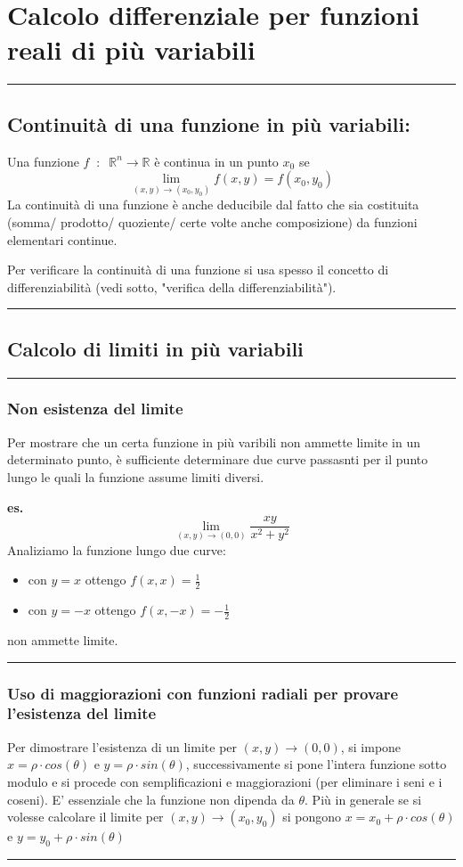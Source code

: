 \section*{Calcolo differenziale per funzioni reali di più variabili}
\rule{\textwidth}{2pt}
\subsection*{Continuità di una funzione in più variabili:}
Una funzione $f \;\;:\;\; \mathbb{R}^n \rightarrow  \mathbb{R}$ è continua in un punto $x_0$ se 
\[
    \lim_{(x,y)\rightarrow (x_0,y_0)} f(x,y) = f(x_0,y_0)
\]
La continuità di una funzione è anche deducibile dal fatto che sia costituita (somma/ prodotto/ quoziente/ certe volte anche composizione) da funzioni elementari continue.
\begin{tcolorbox}
    Per verificare la continuità di una funzione si usa spesso il concetto di differenziabilità (vedi sotto, "verifica della differenziabilità").
\end{tcolorbox}
\rule{\textwidth}{2pt}
\subsection*{Calcolo di limiti in più variabili}
\rule{\textwidth}{0.4pt}
\subsubsection*{Non esistenza del limite}
\begin{tcolorbox}
Per mostrare che un certa funzione in più varibili non ammette limite in un determinato punto, è sufficiente determinare due curve passasnti per il punto lungo le quali la funzione assume limiti diversi.
\end{tcolorbox}
\textbf{es.} 
\[
    \lim_{(x,y)\rightarrow (0,0)} \frac{xy}{x^2+y^2}
\]
Analiziamo la funzione lungo due curve:
\begin{itemize}
    \item con $y=x$ ottengo $f(x,x) = \frac{1}{2}$
    \item con $y=-x$ ottengo $f(x,-x) = - \frac{1}{2}$
\end{itemize}
non ammette limite.\newline
\rule{\textwidth}{0.4pt}
\subsubsection*{Uso di maggiorazioni con funzioni radiali per provare l'esistenza del limite}
\begin{tcolorbox}
Per dimostrare l'esistenza di un limite per $(x,y) \rightarrow (0,0)$, si impone $x=\rho \cdot  cos(\theta)$ e $y= \rho \cdot sin(\theta)$, successivamente si pone l'intera funzione sotto modulo e si procede con semplificazioni e maggiorazioni (per eliminare i seni e i coseni). E' essenziale che la funzione non dipenda da $\theta$.\newline
Più in generale se si volesse calcolare il limite per $(x,y) \rightarrow (x_0, y_0)$ si pongono $x=x_0 +\rho \cdot  cos(\theta)$ e $y= y_0 + \rho \cdot sin(\theta)$
\end{tcolorbox}
\rule{\textwidth}{0.4pt}
